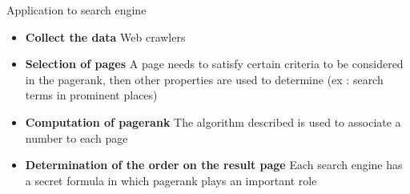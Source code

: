 \documentclass[10pt]{beamer}
\begin{document}
\begin{frame}{Application to search engine}
  \begin{itemize}
    \item \textbf{Collect the data} Web crawlers
    \item \textbf{Selection of pages} A page needs to satisfy certain criteria to be considered in the pagerank, then other properties are used to determine (ex : search terms in prominent places)
    \item \textbf{Computation of pagerank} The algorithm described is used to associate a number to each page
    \item \textbf{Determination of the order on the result page} Each search engine has a secret formula in which pagerank plays an important role
  \end{itemize}
\end{frame}
\end{document}
